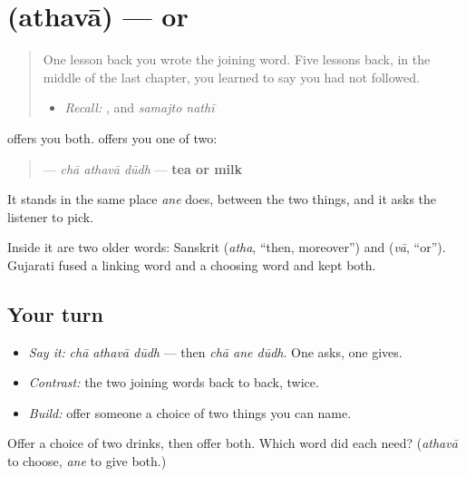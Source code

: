 \section[\texorpdfstring{\gu{અથવા} (athavā)}{અથવા (athavā)}]{ (athavā) — or}

\label{lesson:GU-C32-athava}



\begin{quote}
One lesson back you wrote the joining word. Five lessons back, in the middle of the last chapter, you learned to say you had not followed.

\begin{itemize}
\raggedright
  \item \emph{Recall:} \textbf{}, and \emph{samajto nathī}
\end{itemize}
\end{quote}

\begin{cousinweb}
\textbf{} offers you both. \textbf{} offers you one of two:

\begin{quote}
\textbf{  } — \emph{chā athavā dūdh} — \textbf{tea or milk}
\end{quote}

It stands in the same place \emph{ane} does, between the two things, and it asks the listener to pick.

Inside it are two older words: Sanskrit \textbf{} (\emph{atha}, \textquotedblleft{}then, moreover\textquotedblright{}) and \textbf{} (\emph{vā}, \textquotedblleft{}or\textquotedblright{}). Gujarati fused a linking word and a choosing word and kept both.
\end{cousinweb}

\subsection*{Your turn}
\begin{itemize}
\raggedright
  \item \emph{Say it:} \emph{chā athavā dūdh} — then \emph{chā ane dūdh}. One asks, one gives.
  \item \emph{Contrast:} the two joining words back to back, twice.
  \item \emph{Build:} offer someone a choice of two things you can name.
\end{itemize}

\begin{tcolorbox}[breakable,colback=teal!4,colframe=teal!35!black,title={Before you move on}]
Offer a choice of two drinks, then offer both. Which word did each need? (\emph{athavā} to choose, \emph{ane} to give both.)
\end{tcolorbox}

